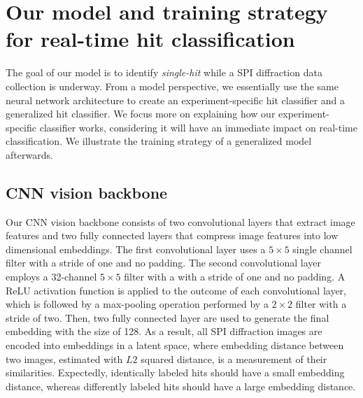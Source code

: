 




















\section{Our model and training strategy for real-time hit classification}

The goal of our model is to identify \textit{single-hit} while a SPI diffraction
data collection is underway.  From a model perspective, we essentially use the
same neural network architecture to create an experiment-specific hit classifier
and a generalized hit classifier.  We focus more on explaining how our
experiment-specific classifier works, considering it will have an immediate
impact on real-time classification.  We illustrate the training strategy of a
generalized model afterwards.  


\subsection{CNN vision backbone}

Our CNN vision backbone consists of two convolutional layers that extract image
features and two fully connected layers that compress image features into low
dimensional embeddings.  The first convolutional layer uses a $5 \times 5$
single channel filter with a stride of one and no padding.  The second
convolutional layer employs a 32-channel $5 \times 5$ filter with a with a
stride of one and no padding.  A ReLU activation function is applied to the
outcome of each convolutional layer, which is followed by a max-pooling
operation performed by a $2\times 2$ filter with a stride of two.  Then, two
fully connected layer are used to generate the final embedding with the size of
128.  As a result, all SPI diffraction images are encoded into embeddings in a
latent space, where embedding distance between two images, estimated with $L2$
squared distance, is a measurement of their similarities.  Expectedly,
identically labeled hits should have a small embedding distance, whereas
differently labeled hits should have a large embedding distance.  


